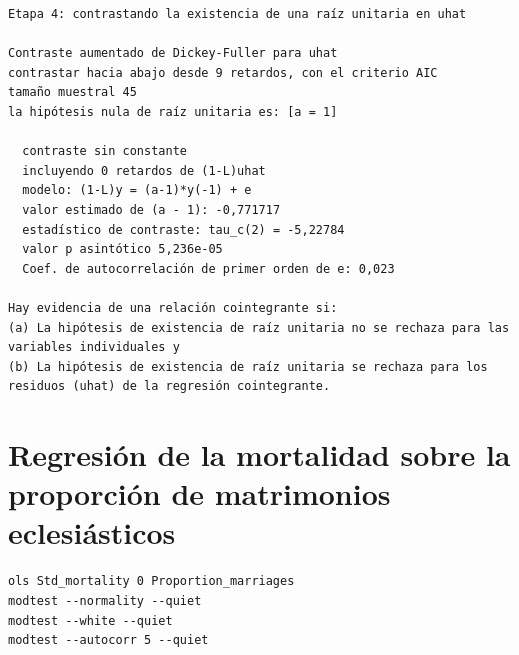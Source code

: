 \documentclass[10pt]{article}
\begin{document}
\begin{verbatim}
Etapa 4: contrastando la existencia de una raíz unitaria en uhat

Contraste aumentado de Dickey-Fuller para uhat
contrastar hacia abajo desde 9 retardos, con el criterio AIC
tamaño muestral 45
la hipótesis nula de raíz unitaria es: [a = 1]

  contraste sin constante 
  incluyendo 0 retardos de (1-L)uhat
  modelo: (1-L)y = (a-1)*y(-1) + e
  valor estimado de (a - 1): -0,771717
  estadístico de contraste: tau_c(2) = -5,22784
  valor p asintótico 5,236e-05
  Coef. de autocorrelación de primer orden de e: 0,023

Hay evidencia de una relación cointegrante si:
(a) La hipótesis de existencia de raíz unitaria no se rechaza para las variables individuales y
(b) La hipótesis de existencia de raíz unitaria se rechaza para los residuos (uhat) de la regresión cointegrante.
\end{verbatim}
\section*{Regresión de la mortalidad sobre la proporción de matrimonios eclesiásticos}
\label{sec:orgd690bd3}

\begin{verbatim}
ols Std_mortality 0 Proportion_marriages
modtest --normality --quiet
modtest --white --quiet
modtest --autocorr 5 --quiet
\end{verbatim}
\end{document}
